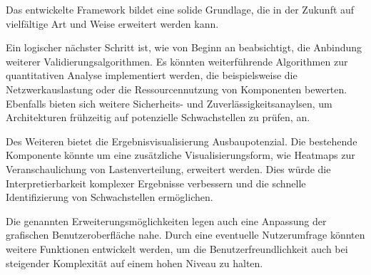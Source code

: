 Das entwickelte Framework bildet eine solide Grundlage, die in der Zukunft auf vielfältige Art und Weise erweitert werden kann.

Ein logischer nächster Schritt ist, wie von Beginn an beabsichtigt, die Anbindung weiterer Validierungsalgorithmen. Es könnten weiterführende Algorithmen zur quantitativen Analyse implementiert werden, die beispielsweise die Netzwerkauslastung oder die Ressourcennutzung von Komponenten bewerten.  Ebenfalls bieten sich weitere Sicherheits- und Zuverlässigkeitsanaylsen, um Architekturen frühzeitig auf potenzielle Schwachstellen zu prüfen, an.

Des Weiteren bietet die Ergebnisvisualisierung Ausbaupotenzial. Die bestehende Komponente könnte um eine zusätzliche Visualisierungsform, wie Heatmaps zur Veranschaulichung von Lastenverteilung, erweitert werden. Dies würde die Interpretierbarkeit komplexer Ergebnisse verbessern und die schnelle Identifizierung von Schwachstellen ermöglichen.

Die genannten Erweiterungsmöglichkeiten legen auch eine Anpassung der grafischen Benutzeroberfläche nahe. Durch eine eventuelle Nutzerumfrage könnten weitere Funktionen entwickelt werden, um die Benutzerfreundlichkeit auch bei steigender Komplexität auf einem hohen Niveau zu halten.